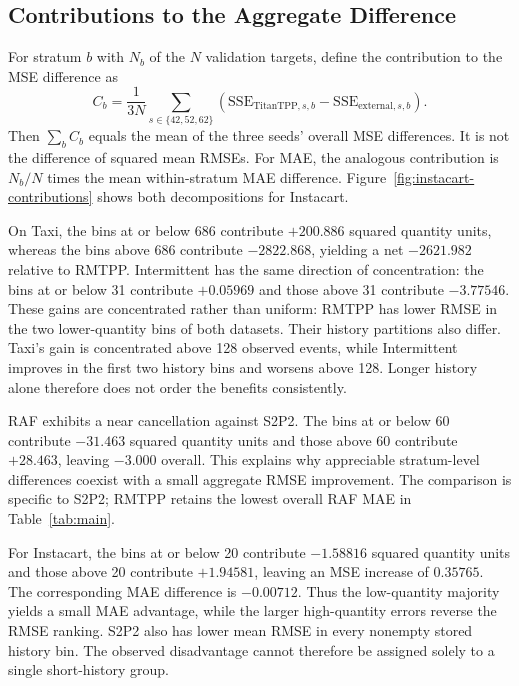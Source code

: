 \subsection{Contributions to the Aggregate Difference}
For stratum $b$ with $N_b$ of the $N$ validation targets, define the
contribution to the MSE difference as
\begin{equation}
 C_b=\frac{1}{3N}\sum_{s\in\{42,52,62\}}
       \left(\mathrm{SSE}_{\mathrm{TitanTPP},s,b}
             -\mathrm{SSE}_{\mathrm{external},s,b}\right).
 \label{eq:mse-contribution}
\end{equation}
Then $\sum_b C_b$ equals the mean of the three seeds' overall MSE
differences. It is not the difference of squared mean RMSEs. For MAE,
the analogous contribution is $N_b/N$ times the mean within-stratum
MAE difference. Figure~\ref{fig:instacart-contributions} shows both
decompositions for Instacart.

On Taxi, the bins at or below 686 contribute $+200.886$ squared quantity
units, whereas the bins above 686 contribute $-2822.868$, yielding a net
$-2621.982$ relative to RMTPP. Intermittent has the same direction of
concentration: the bins at or below 31 contribute $+0.05969$ and those
above 31 contribute $-3.77546$. These gains are concentrated rather than
uniform: RMTPP has lower RMSE in the two lower-quantity bins of both datasets.
Their history partitions also differ. Taxi's gain is concentrated above
128 observed events, while Intermittent improves in the first two history
bins and worsens above 128. Longer history alone therefore does not order
the benefits consistently.

RAF exhibits a near cancellation against S2P2. The bins at or below 60
contribute $-31.463$ squared quantity units and those above 60 contribute
$+28.463$, leaving $-3.000$ overall. This explains why appreciable
stratum-level differences coexist with a small aggregate RMSE improvement.
The comparison is specific to S2P2; RMTPP retains the lowest overall RAF
MAE in Table~\ref{tab:main}.

For Instacart, the bins at or below 20 contribute $-1.58816$ squared
quantity units and those above 20 contribute $+1.94581$, leaving an MSE
increase of $0.35765$. The corresponding MAE difference is $-0.00712$.
Thus the low-quantity majority yields a small MAE advantage, while the
larger high-quantity errors reverse the RMSE ranking. S2P2 also has lower
mean RMSE in every nonempty stored history bin. The observed disadvantage
cannot therefore be assigned solely to a single short-history group.

